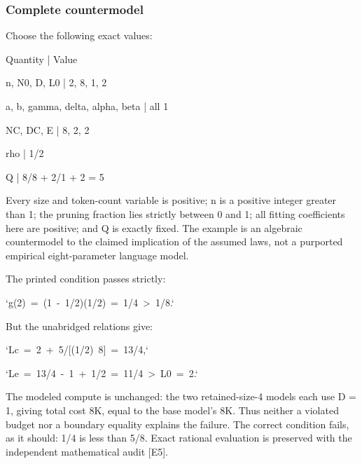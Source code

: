 \documentclass[10pt]{article}
\begin{document}
\subsubsection*{Complete countermodel}
Choose the following exact values:\par
Quantity | Value\par
n, N0, D, L0 | 2, 8, 1, 2\par
a, b, gamma, delta, alpha, beta | all 1\par
NC, DC, E | 8, 2, 2\par
rho | 1/2\par
Q | 8/8 + 2/1 + 2 = 5\par
Every size and token-count variable is positive; n is a positive integer greater than 1; the pruning fraction lies strictly between 0 and 1; all fitting coefficients here are positive; and Q is exactly fixed. The example is an algebraic countermodel to the claimed implication of the assumed laws, not a purported empirical eight-parameter language model.\par
The printed condition passes strictly:\par
`g(2) = (1 - 1/2)(1/2) = 1/4 > 1/8.`\par
But the unabridged relations give:\par
`Lc = 2 + 5/[(1/2) 8] = 13/4,`\par
`Le = 13/4 - 1 + 1/2 = 11/4 > L0 = 2.`\par
The modeled compute is unchanged: the two retained-size-4 models each use D = 1, giving total cost 8K, equal to the base model’s 8K. Thus neither a violated budget nor a boundary equality explains the failure. The correct condition fails, as it should: 1/4 is less than 5/8. Exact rational evaluation is preserved with the independent mathematical audit [E5].\par
\end{document}

